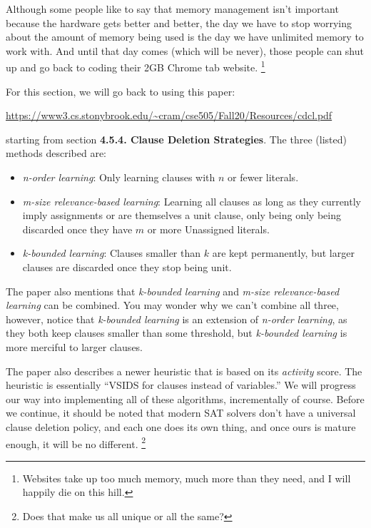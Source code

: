 \documentclass[../main.tex]{subfiles}
\begin{document}
Although some people like to say that memory management isn't important because the 
hardware gets better and better, the day we have to stop worrying about the amount 
of memory being used is the day we have unlimited memory to work with. And until that 
day comes (which will be never), those people can shut up and go back to coding their 
2GB Chrome tab website. 
\footnote{Websites take up too much memory, much more than they need, 
and I will happily die on this hill.}

For this section, we will go back to using this paper:
\begin{center}
    \small{\url{https://www3.cs.stonybrook.edu/~cram/cse505/Fall20/Resources/cdcl.pdf}}
\end{center}
starting from section \textbf{4.5.4. Clause Deletion Strategies}.
The three (listed) methods described are:
\begin{itemize}
    \item \textit{n-order learning}: Only learning clauses with $n$ or fewer literals.
    \item \textit{m-size relevance-based learning}: Learning all clauses as long as they 
            currently imply assignments or are themselves a unit clause, only being
            only being discarded once they have $m$ or more Unassigned literals.
    \item \textit{k-bounded learning}: Clauses smaller than $k$ are kept permanently,
            but larger clauses are discarded once they stop being unit.
\end{itemize}
\noindent
The paper also mentions that \textit{k-bounded learning} and \textit{m-size relevance-based learning}
can be combined. You may wonder why we can't combine all three, however, notice that 
\textit{k-bounded learning} is an extension of \textit{n-order learning}, as they both keep 
clauses smaller than some threshold, but \textit{k-bounded learning} is more merciful to 
larger clauses.

The paper also describes a newer heuristic that is based on its \textit{activity} score. 
The heuristic is essentially ``VSIDS for clauses instead of variables.'' We will progress our 
way into implementing all of these algorithms, incrementally of course. Before we continue, it 
should be noted that modern SAT solvers don't have a universal clause deletion policy, and each 
one does its own thing, and once ours is mature enough, it will be no different.
\footnote{Does that make us all unique or all the same?}
\end{document}
